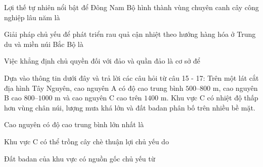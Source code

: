 \begin{ex}
Lợi thế tự nhiên nổi bật để Đông Nam Bộ hình thành vùng chuyên canh cây công nghiệp lâu năm là
\end{ex}

\begin{ex}
Giải pháp chủ yếu để phát triển rau quả cận nhiệt theo hướng hàng hóa ở Trung du và miền núi Bắc Bộ là
\end{ex}

\begin{ex}
Việc khẳng định chủ quyền đối với đảo và quần đảo là cơ sở để
\end{ex}

\begin{baidoc}
\item[] Dựa vào thông tin dưới đây và trả lời các câu hỏi từ câu 15 - 17:
Trên một lát cắt địa hình Tây Nguyên, cao nguyên A có độ cao trung bình $500$--$800$ m, cao nguyên B cao $800$--$1000$ m và cao nguyên C cao trên $1400$ m. Khu vực C có nhiệt độ thấp hơn vùng chân núi, lượng mưa khá lớn và đất badan phân bố trên nhiều bề mặt.

\begin{ex}
Cao nguyên có độ cao trung bình lớn nhất là
\end{ex}

\begin{ex}
Khu vực C có thể trồng cây chè thuận lợi chủ yếu do
\end{ex}

\begin{ex}
Đất badan của khu vực có nguồn gốc chủ yếu từ
\end{ex}
\end{baidoc}

